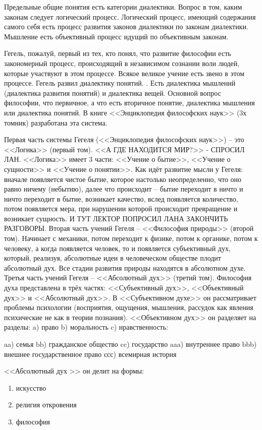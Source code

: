 Предельные общие понятия есть категории диалектики. Вопрос в том, каким законам следует логический процесс. Логический процесс, имеющий содержания самого себя есть процесс развития законов диалектики по законам диалектики. Мышление есть объективный процесс идущий по объективным законам.

Гегель, пожалуй, первый из тех, кто понял, что развитие философии есть закономерный процесс, происходящий в независимом сознании воли людей, которые участвуют в этом процессе. Всякое великое учение есть звено в этом процессе. Гегель развил диалектику понятий. . Есть диалектика мышлений (диалектика развития понятий) и диалектика вещей. Основной вопрос философии, что первичное, а что есть вторичное понятие, диалектика мышления или диалектика понятий. В книге <<Энциклопедия философских наук>> (3х томник) разработана эта система.

Первая часть системы Гегеля (<<Энциклопедия философских наук>>) – это <<Логика>> (первый том). <<А ГДЕ НАХОДИТСЯ МИР?>> - СПРОСИЛ ЛАН. <<Логика>> имеет 3 части: <<Учение о бытие>>, <<Учение о сущности>> и <<Учение о понятии>>. Как идёт развитие мысли у Гегеля: вначале появляется чистое бытие, которое настолько неопределенно, что оно равно ничему (небытию), далее что происходит – бытие переходит в ничто и ничто переходит в бытие, возникает качество, вслед появляется количество, потом появляется мера, при нарушении которой происходит превращение и возникает сущность. И ТУТ ЛЕКТОР ПОПРОСИЛ ЛАНА ЗАКОНЧИТЬ РАЗГОВОРЫ. Вторая часть учений Гегеля – <<Философия природы>> (второй том). Начинает с механики, потом переходит к физике, потом к органике, потом к человеку, а когда появляется человек, то и появляется субъективный дух, который, реализуя, абсолютные идеи в человеческом обществе плодит абсолютный дух. Все стадии развития природы находятся в абсолютном духе. Третья часть учений Гегеля – <<Абсолютный дух>> (третий том). Философия духа представлена в трёх частях: <<Субъективный дух>>, <<Объективный дух>> и <<Абсолютный дух>>. В <<Субъективном духе>> он рассматривает проблемы психологии (восприятия, ощущения, мышления, рассудок как явления психические не как в теории познания). <<Объективном дух>> он разделяет на разделы: a) право b) моральность c) нравственность:

aa) семья
bb) гражданское общество
cc) государство
	aaa) внутреннее право
	bbb) внешнее государственное право
	ссс) всемирная история

<<Абсолютный дух >> он делит на формы: 
\begin{enumerate}
\item искусство 
\item религия откровения 
\item философия
\end{enumerate}